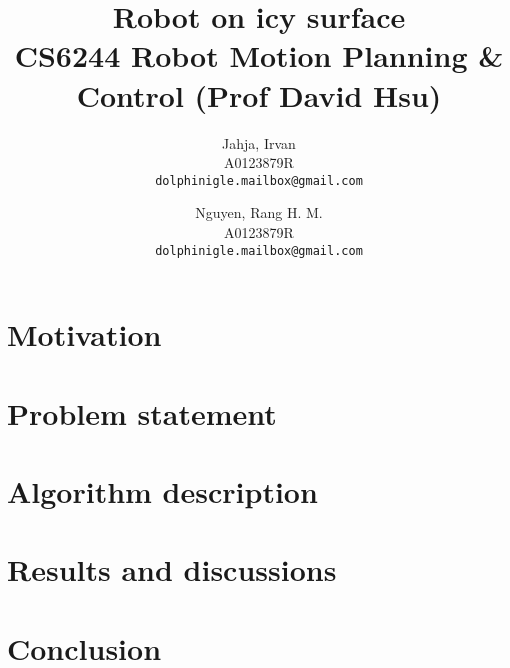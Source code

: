 \documentclass[a4paper]{article}
\title{Robot on icy surface \\ {\small CS6244 Robot Motion Planning \& Control (Prof David Hsu)} }
\author{
  Jahja, Irvan\\
  {\small A0123879R} \\ \texttt{dolphinigle.mailbox@gmail.com}
  \and
  Nguyen, Rang H. M.\\
  {\small A0123879R} \\ \texttt{dolphinigle.mailbox@gmail.com}
}
\begin{document}
\maketitle

\section{Motivation}

\section{Problem statement}

\section{Algorithm description}

\section{Results and discussions}

\section{Conclusion}
\end{document}
